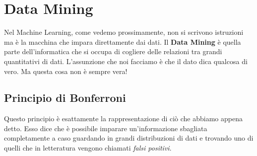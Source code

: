 \section{Data Mining}
Nel Machine Learning, come vedemo prossimamente, non si scrivono istruzioni ma è la macchina che impara direttamente dai dati. Il \textbf{Data Mining} è quella parte dell'informatica che si occupa di cogliere delle relazioni tra grandi quantitativi di dati. L'assunzione che noi facciamo è che il dato dica qualcosa di vero. Ma questa cosa non è sempre vera!

\subsection{Principio di Bonferroni}
Questo principio è esattamente la rappresentazione di ciò che abbiamo appena detto. Esso dice che è possibile imparare un'informazione sbagliata completamente a caso guardando in grandi distribuzioni di dati e trovando uno di quelli che in letteratura vengono chiamati \textit{falsi positivi}.

